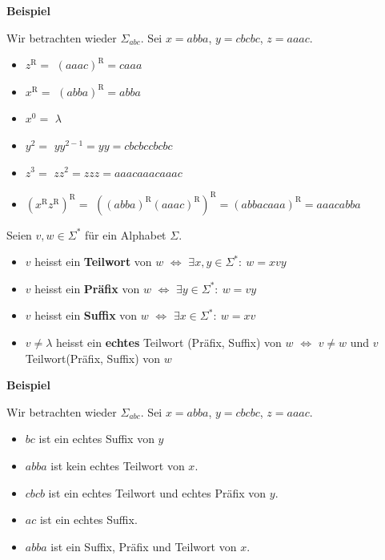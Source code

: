 \documentclass[a4paper, 11pt]{article}
\newcommand\myTitle[1]{{\large \textbf {#1}}}
\begin{document}
	\myTitle{Beispiel}

	Wir betrachten wieder $\Sigma_{abc}$. Sei $x = abba$, $y = cbcbc$, $z = aaac$.
	\begin{itemize}[label = -]
		\item $z^\text{R} =$  $ (aaac)^\text{R} = caaa$
		\item $x^\text{R} =$  $ (abba)^\text{R} = abba$
		\item $x^0 = $  $ \lambda$
		\item  $y^2 = $ $yy^{2-1}= yy = cbcbccbcbc$
		\item $z^3 =$  $zz^2= zzz = aaacaaacaaac$
		\item $(x^\text{R}z^\text{R})^\text{R} = $ $((abba)^\text{R}(aaac)^\text{R})^\text{R} = (abbacaaa)^\text{R} = aaacabba$
	\end{itemize}

	



	
	\begin{mainbox}{}
		Seien $v, w \in \Sigma^*$ für ein Alphabet $\Sigma$.
		\begin{itemize}[label=-]
			\item $v$ heisst ein \textbf{Teilwort} von $w$ $\iff$ $\exists x,y \in \Sigma^*: \ w = xvy$
			\item $v$ heisst ein \textbf{Präfix} von $w$ $\iff$ $\exists y \in \Sigma^*: \ w = vy$
			\item $v$ heisst ein \textbf{Suffix} von $w$ $\iff$ $\exists x \in \Sigma^*: \ w = xv$
			\item $v \neq \lambda$ heisst ein \textbf{echtes} Teilwort (Präfix, Suffix) von $w$ $\iff$ $v \neq w$ und $v$ Teilwort(Präfix, Suffix) von $w$
		\end{itemize}
	\end{mainbox}



	\myTitle{Beispiel}

	Wir betrachten wieder $\Sigma_{abc}$. Sei $x = abba$, $y = cbcbc$, $z = aaac$.
	\begin{itemize}[label=-]
		\item $bc$ ist ein echtes Suffix von $y$
		\item $abba$ ist kein echtes Teilwort von $x$.
		\item $cbcb$ ist ein echtes Teilwort und echtes Präfix von $y$.
		\item $ac$ ist ein echtes Suffix.
		\item $abba$ ist ein Suffix, Präfix und Teilwort von $x$.
	\end{itemize}
\end{document}
